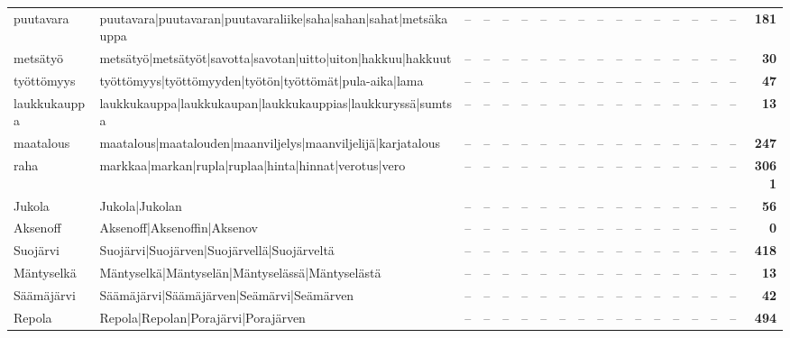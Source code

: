 \documentclass[10pt,a4paper]{article}
\begin{document}
\begin{center}
\begin{longtable}{@{}lp{52mm}rrrrrrrrrrrrrrrr@{}}
puutavara & {\ttfamily puutavara|puutavaran|puutavaraliike|saha|sahan|sahat|metsäkauppa} & -- & -- & -- & -- & -- & -- & -- & -- & -- & -- & -- & -- & -- & -- & -- & \textbf{181} \\
metsätyö & {\ttfamily metsätyö|metsätyöt|savotta|savotan|uitto|uiton|hakkuu|hakkuut} & -- & -- & -- & -- & -- & -- & -- & -- & -- & -- & -- & -- & -- & -- & -- & \textbf{30} \\
työttömyys & {\ttfamily työttömyys|työttömyyden|työtön|työttömät|pula-aika|lama} & -- & -- & -- & -- & -- & -- & -- & -- & -- & -- & -- & -- & -- & -- & -- & \textbf{47} \\
laukkukauppa & {\ttfamily laukkukauppa|laukkukaupan|laukkukauppias|laukkuryssä|sumtsa} & -- & -- & -- & -- & -- & -- & -- & -- & -- & -- & -- & -- & -- & -- & -- & \textbf{13} \\
maatalous & {\ttfamily maatalous|maatalouden|maanviljelys|maanviljelijä|karjatalous} & -- & -- & -- & -- & -- & -- & -- & -- & -- & -- & -- & -- & -- & -- & -- & \textbf{247} \\
raha & {\ttfamily markkaa|markan|rupla|ruplaa|hinta|hinnat|verotus|vero} & -- & -- & -- & -- & -- & -- & -- & -- & -- & -- & -- & -- & -- & -- & -- & \textbf{3061} \\
Jukola & {\ttfamily Jukola|Jukolan} & -- & -- & -- & -- & -- & -- & -- & -- & -- & -- & -- & -- & -- & -- & -- & \textbf{56} \\
Aksenoff & {\ttfamily Aksenoff|Aksenoffin|Aksenov} & -- & -- & -- & -- & -- & -- & -- & -- & -- & -- & -- & -- & -- & -- & -- & \textbf{0} \\
Suojärvi & {\ttfamily Suojärvi|Suojärven|Suojärvellä|Suojärveltä} & -- & -- & -- & -- & -- & -- & -- & -- & -- & -- & -- & -- & -- & -- & -- & \textbf{418} \\
Mäntyselkä & {\ttfamily Mäntyselkä|Mäntyselän|Mäntyselässä|Mäntyselästä} & -- & -- & -- & -- & -- & -- & -- & -- & -- & -- & -- & -- & -- & -- & -- & \textbf{13} \\
Säämäjärvi & {\ttfamily Säämäjärvi|Säämäjärven|Seämärvi|Seämärven} & -- & -- & -- & -- & -- & -- & -- & -- & -- & -- & -- & -- & -- & -- & -- & \textbf{42} \\
Repola & {\ttfamily Repola|Repolan|Porajärvi|Porajärven} & -- & -- & -- & -- & -- & -- & -- & -- & -- & -- & -- & -- & -- & -- & -- & \textbf{494} \\
\bottomrule
\end{longtable}
\end{center}
\end{document}
